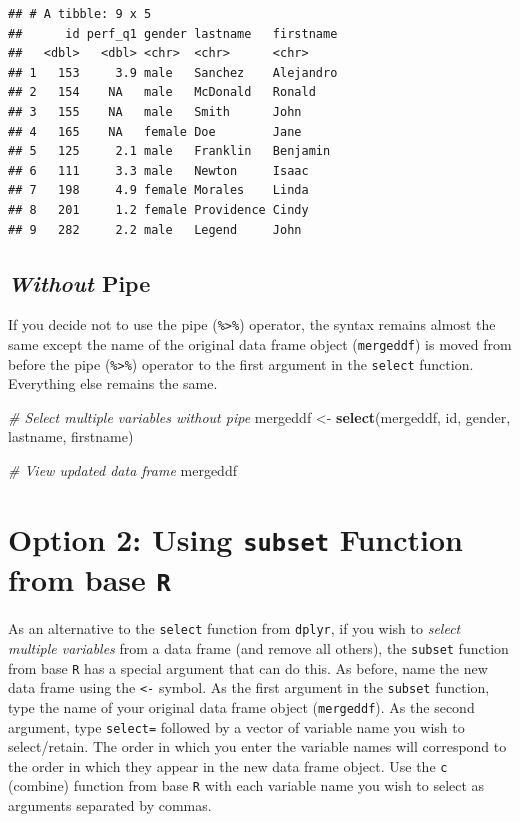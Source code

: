 \documentclass[]{book}
\newenvironment{Shaded}{\begin{snugshade}}{\end{snugshade}}
\newcommand{\KeywordTok}[1]{\textcolor[rgb]{0.13,0.29,0.53}{\textbf{#1}}}
\newcommand{\StringTok}[1]{\textcolor[rgb]{0.31,0.60,0.02}{#1}}
\newcommand{\CommentTok}[1]{\textcolor[rgb]{0.56,0.35,0.01}{\textit{#1}}}
\newcommand{\NormalTok}[1]{#1}
\begin{document}
\begin{verbatim}
## # A tibble: 9 x 5
##      id perf_q1 gender lastname   firstname
##   <dbl>   <dbl> <chr>  <chr>      <chr>    
## 1   153     3.9 male   Sanchez    Alejandro
## 2   154    NA   male   McDonald   Ronald   
## 3   155    NA   male   Smith      John     
## 4   165    NA   female Doe        Jane     
## 5   125     2.1 male   Franklin   Benjamin 
## 6   111     3.3 male   Newton     Isaac    
## 7   198     4.9 female Morales    Linda    
## 8   201     1.2 female Providence Cindy    
## 9   282     2.2 male   Legend     John
\end{verbatim}

\subsection{\texorpdfstring{\emph{Without}
Pipe}{Without Pipe}}\label{without-pipe}

If you decide not to use the pipe (\texttt{\%\textgreater{}\%})
operator, the syntax remains almost the same except the name of the
original data frame object (\texttt{mergeddf}) is moved from before the
pipe (\texttt{\%\textgreater{}\%}) operator to the first argument in the
\texttt{select} function. Everything else remains the same.

\begin{Shaded}
\begin{Highlighting}[]
\CommentTok{# Select multiple variables without pipe}
\NormalTok{mergeddf <-}\StringTok{ }\KeywordTok{select}\NormalTok{(mergeddf, id, gender, lastname, firstname)}

\CommentTok{# View updated data frame}
\NormalTok{mergeddf}
\end{Highlighting}
\end{Shaded}

\section{\texorpdfstring{Option 2: Using \texttt{subset} Function from
base
\texttt{R}}{Option 2: Using subset Function from base R}}\label{option-2-using-subset-function-from-base-r-1}

As an alternative to the \texttt{select} function from \texttt{dplyr},
if you wish to \emph{select multiple variables} from a data frame (and
remove all others), the \texttt{subset} function from base \texttt{R}
has a special argument that can do this. As before, name the new data
frame using the \texttt{\textless{}-} symbol. As the first argument in
the \texttt{subset} function, type the name of your original data frame
object (\texttt{mergeddf}). As the second argument, type
\texttt{select=} followed by a vector of variable name you wish to
select/retain. The order in which you enter the variable names will
correspond to the order in which they appear in the new data frame
object. Use the \texttt{c} (combine) function from base \texttt{R} with
each variable name you wish to select as arguments separated by commas.
\end{document}
